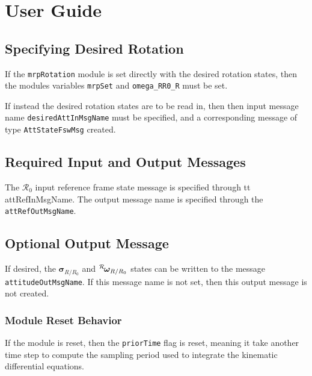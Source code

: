 
\section{User Guide}
\subsection{Specifying Desired Rotation}
If the {\tt mrpRotation} module is set directly with the desired rotation states, then the modules variables {\tt mrpSet} and {\tt omega\_RR0\_R} must be set.

If instead the desired rotation states are to be read in, then then input message name {\tt desiredAttInMsgName} must be specified, and a corresponding message of type {\tt AttStateFswMsg} created.  

\subsection{Required Input and Output Messages}
The $\mathcal{R}_{0}$ input reference frame state message is specified through {tt attRefInMsgName}.
The output message name is specified through the {\tt attRefOutMsgName}. 

\subsection{Optional Output Message}
If desired, the $\bm\sigma_{R/R_{0}}$ and $\leftexp{R}{\bm\omega}_{R/R_{0}}$ states can be written to the message {\tt attitudeOutMsgName}.  If this message name is not set, then this output message is not created.  

\subsubsection{Module Reset Behavior}
If the module is reset, then the {\tt priorTime} flag is reset, meaning it take another time step to compute the sampling period used to integrate the kinematic differential equations.  